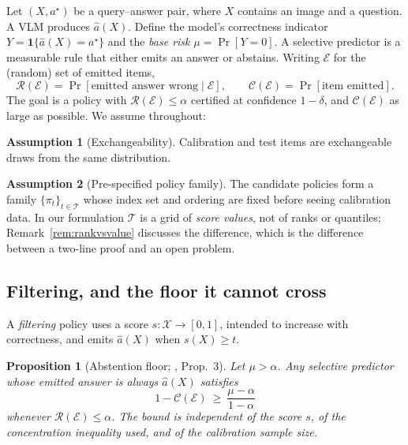 \documentclass{article}
\theoremstyle{plain}
\newtheorem{proposition}{Proposition}
\theoremstyle{definition}
\newtheorem{assumption}{Assumption}
\theoremstyle{remark}
\newcommand{\Risk}{\mathcal{R}}
\newcommand{\Cov}{\mathcal{C}}
\newcommand{\emit}{\mathcal{E}}
\begin{document}
Let $(X,a^\star)$ be a query--answer pair, where $X$ contains an image and a question. A
VLM produces $\hat a(X)$. Define the model's correctness indicator
$Y=\mathbf{1}\{\hat a(X)=a^\star\}$ and the \emph{base risk} $\mu=\Pr[Y=0]$. A selective
predictor is a measurable rule that either emits an answer or abstains. Writing $\emit$ for
the (random) set of emitted items,
\[
\Risk(\emit)=\Pr[\text{emitted answer wrong}\mid \emit],\qquad
\Cov(\emit)=\Pr[\text{item emitted}].
\]
The goal is a policy with $\Risk(\emit)\le\alpha$ certified at confidence $1-\delta$, and
$\Cov(\emit)$ as large as possible. We assume throughout:

\begin{assumption}[Exchangeability]
\label{ass:exch}
Calibration and test items are exchangeable draws from the same distribution.
\end{assumption}

\begin{assumption}[Pre-specified policy family]
\label{ass:family}
The candidate policies form a family $\{\pi_t\}_{t\in\mathcal{T}}$ whose index set and
ordering are fixed before seeing calibration data. In our formulation $\mathcal{T}$ is a grid
of \emph{score values}, not of ranks or quantiles; Remark~\ref{rem:rankvsvalue} discusses the
difference, which is the difference between a two-line proof and an open problem.
\end{assumption}

\subsection{Filtering, and the floor it cannot cross}

A \emph{filtering} policy uses a score $s:\mathcal{X}\to[0,1]$, intended to increase with
correctness, and emits $\hat a(X)$ when $s(X)\ge t$.

\begin{proposition}[Abstention floor; \citealt{crcimposs}, Prop.~3]
\label{prop:floor}
Let $\mu>\alpha$. Any selective predictor whose emitted answer is always $\hat a(X)$
satisfies
\[
1-\Cov(\emit)\ \ge\ \frac{\mu-\alpha}{1-\alpha}
\]
whenever $\Risk(\emit)\le\alpha$. The bound is independent of the score $s$, of the
concentration inequality used, and of the calibration sample size.
\end{proposition}
\end{document}
